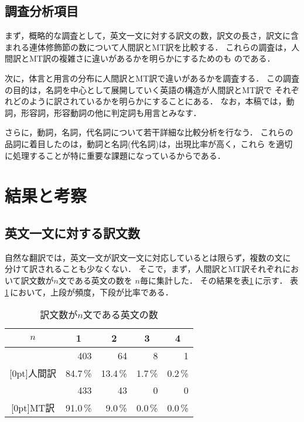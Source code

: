 \subsection{調査分析項目}
\label{sec:method:items-checked}

まず，概略的な調査として，英文一文に対する訳文の数，訳文の長さ，訳文に含
まれる連体修飾節の数について人間訳とMT訳を比較する．
これらの調査は，人間訳とMT訳の複雑さに違いがあるかを明らかにするためのも
のである．

次に，体言と用言の分布に人間訳とMT訳で違いがあるかを調査する．
この調査の目的は，名詞を中心として展開していく英語の構造が人間訳とMT訳で
それぞれどのように訳されているかを明らかにすることにある．
なお，本稿では，動詞，形容詞，形容動詞の他に判定詞も用言とみなす．

さらに，動詞，名詞，代名詞について若干詳細な比較分析を行なう．
これらの品詞に着目したのは，動詞と名詞(代名詞)は，出現比率が高く，これら
を適切に処理することが特に重要な課題になっているからである．


\section{結果と考察}
\label{sec:result}


\subsection{英文一文に対する訳文数}
\label{sec:result:num-of-sent}

自然な翻訳では，英文一文が訳文一文に対応しているとは限らず，複数の文に
分けて訳されることも少なくない．
そこで，まず，人間訳とMT訳それぞれにおいて訳文数が$n$文である英文の数を
$n$毎に集計した．
その結果を表\ref{tab:ej-sent-num}\,に示す．
表\ref{tab:ej-sent-num}\,において，上段が頻度，下段が比率である．
\begin{table}[htbp]
\caption{訳文数が$n$文である英文の数}
\label{tab:ej-sent-num}
\begin{center}
\begin{tabular}{|c||r|r|r|r|}\hline
$n$    & \multicolumn{1}{c|}{1} & \multicolumn{1}{c|}{2} & 
\multicolumn{1}{c|}{3} & \multicolumn{1}{c|}{4} \\\hline\hline
 & 403 & 64 & 8 & 1 \\
\raisebox{1.5ex}[0pt]{人間訳} & 84.7\,\% & 13.4\,\% & 1.7\,\% & 0.2\,\% \\\hline
 & 433 & 43 & 0 & 0 \\
\raisebox{1.5ex}[0pt]{MT訳} & 91.0\,\% & 9.0\,\% & 0.0\,\% & 0.0\,\%\\\hline
\end{tabular}
\end{center}
\end{table}

